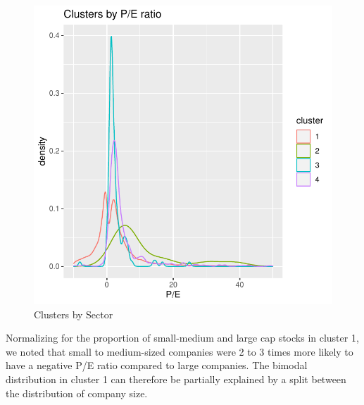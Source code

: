 \documentclass[11pt,]{article}
\begin{document}
\begin{figure}

{\centering \includegraphics{stock_analysis_files/figure-latex/pe ratio-1} 

}

\caption{Clusters by Sector}\label{fig:pe ratio}
\end{figure}

Normalizing for the proportion of small-medium and large cap stocks in
cluster 1, we noted that small to medium-sized companies were 2 to 3
times more likely to have a negative P/E ratio compared to large
companies. The bimodal distribution in cluster 1 can therefore be
partially explained by a split between the distribution of company size.
\end{document}
